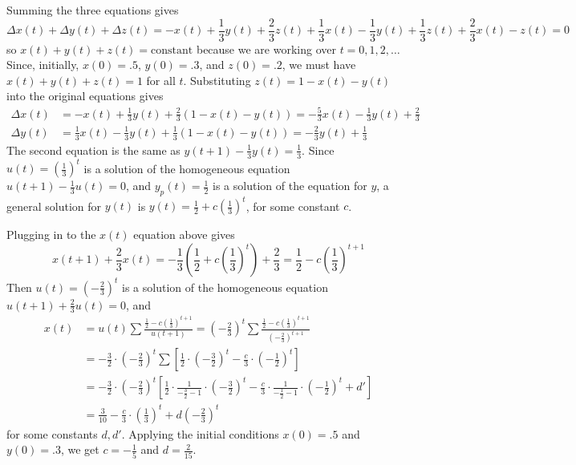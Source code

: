 \documentclass[newpage]{homework}
\begin{document}
	 Summing the three equations gives
	\begin{equation*}
		\Delta x(t) + \Delta y(t) + \Delta z(t) = -x(t) + \frac{1}{3}y(t) + \frac{2}{3}z(t) + \frac{1}{3}x(t) - \frac{1}{3}y(t) + \frac{1}{3}z(t) + \frac{2}{3}x(t) -z(t) = 0
	\end{equation*}
	so $x(t) + y(t) + z(t) = \text{constant}$ because we are working over $t=0,1,2,\dots$ Since, initially, $x(0) = .5$, $y(0) = .3$, and $z(0) = .2$, we must have $x(t) + y(t) +z(t) = 1$ for all $t$. Substituting $z(t) = 1 - x(t) - y(t)$ into the original equations gives
	\begin{equation*}
		\begin{aligned}
			\Delta x(t) &= -x(t) + \frac{1}{3}y(t) + \frac{2}{3}(1-x(t) - y(t)) = -\frac{5}{3}x(t)-\frac{1}{3}y(t) + \frac{2}{3} \\
			\Delta y(t) &= \frac{1}{3}x(t) -\frac{1}{3}y(t) +\frac{1}{3}(1-x(t)-y(t)) = -\frac{2}{3}y(t) + \frac{1}{3}
		\end{aligned}
	\end{equation*}
	The second equation is the same as $y(t+1) - \frac{1}{3}y(t) = \frac{1}{3}$. Since $u(t) = \left(\frac{1}{3}\right)^t$ is a solution of the homogeneous equation $u(t+1) - \frac{1}{3}u(t) = 0$, and $y_p(t) = \frac{1}{2}$ is a solution of the equation for $y$, a general solution for $y(t)$ is $y(t) = \frac{1}{2} + c\left(\frac{1}{3}\right)^t$, for some constant $c$.
	
	Plugging in to the $x(t)$ equation above gives
	\begin{equation*}
		x(t+1) + \frac{2}{3}x(t) = -\frac{1}{3}\left(\frac{1}{2} + c\left(\frac{1}{3}\right)^t\right) + \frac{2}{3} = \frac{1}{2} - c\left(\frac{1}{3}\right)^{t+1}
	\end{equation*}
	Then $u(t) = \left(-\frac{2}{3}\right)^t$ is a solution of the homogeneous equation $u(t+1) + \frac{2}{3}u(t) = 0$, and
	\begin{equation*}
		\begin{aligned}
			x(t) &= u(t) \sum \frac{\frac{1}{2} - c\left(\frac{1}{3}\right)^{t+1}}{u(t+1)} = \left(-\frac{2}{3}\right)^t\sum\frac{\frac{1}{2} - c\left(\frac{1}{3}\right)^{t+1}}{\left(-\frac{2}{3}\right)^{t+1}}\\
			&= -\frac{3}{2}\cdot\left(-\frac{2}{3}\right)^t\sum \left[\frac{1}{2}\cdot\left(-\frac{3}{2}\right)^t - \frac{c}{3}\cdot\left(-\frac{1}{2}\right)^t\right] \\
			&= -\frac{3}{2}\cdot\left(-\frac{2}{3}\right)^t\left[\frac{1}{2}\cdot\frac{1}{-\frac{3}{2} - 1}\cdot\left(-\frac{3}{2}\right)^t - \frac{c}{3}\cdot\frac{1}{-\frac{1}{2} - 1}\cdot\left(-\frac{1}{2}\right)^t + d'\right] \\
			&= \frac{3}{10} - \frac{c}{3}\cdot\left(\frac{1}{3}\right)^t + d\left(-\frac{2}{3}\right)^t
		\end{aligned}
	\end{equation*}
	for some constants $d,d'$. Applying the initial conditions $x(0) = .5$ and $y(0) = .3$, we get $c = -\frac{1}{5}$ and $d=\frac{2}{15}$.
	
\end{document}
